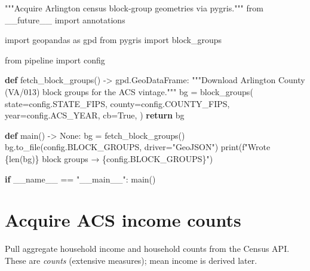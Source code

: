 \documentclass[
  letterpaper,
  DIV=11,
  numbers=noendperiod]{scrreprt}
\newenvironment{Shaded}{\begin{snugshade}}{\end{snugshade}}
\newcommand{\BuiltInTok}[1]{\textcolor[rgb]{0.00,0.23,0.31}{#1}}
\newcommand{\CommentTok}[1]{\textcolor[rgb]{0.37,0.37,0.37}{#1}}
\newcommand{\ControlFlowTok}[1]{\textcolor[rgb]{0.00,0.23,0.31}{\textbf{#1}}}
\newcommand{\ImportTok}[1]{\textcolor[rgb]{0.00,0.46,0.62}{#1}}
\newcommand{\KeywordTok}[1]{\textcolor[rgb]{0.00,0.23,0.31}{\textbf{#1}}}
\newcommand{\NormalTok}[1]{\textcolor[rgb]{0.00,0.23,0.31}{#1}}
\newcommand{\OperatorTok}[1]{\textcolor[rgb]{0.37,0.37,0.37}{#1}}
\newcommand{\SpecialCharTok}[1]{\textcolor[rgb]{0.37,0.37,0.37}{#1}}
\newcommand{\SpecialStringTok}[1]{\textcolor[rgb]{0.13,0.47,0.30}{#1}}
\newcommand{\StringTok}[1]{\textcolor[rgb]{0.13,0.47,0.30}{#1}}
\newcommand{\VariableTok}[1]{\textcolor[rgb]{0.07,0.07,0.07}{#1}}
\begin{document}
\begin{Shaded}
\begin{Highlighting}[]
\CommentTok{"""Acquire Arlington census block{-}group geometries via pygris."""}
\ImportTok{from}\NormalTok{ \_\_future\_\_ }\ImportTok{import}\NormalTok{ annotations}

\ImportTok{import}\NormalTok{ geopandas }\ImportTok{as}\NormalTok{ gpd}
\ImportTok{from}\NormalTok{ pygris }\ImportTok{import}\NormalTok{ block\_groups}

\ImportTok{from}\NormalTok{ pipeline }\ImportTok{import}\NormalTok{ config}


\KeywordTok{def}\NormalTok{ fetch\_block\_groups() }\OperatorTok{{-}\textgreater{}}\NormalTok{ gpd.GeoDataFrame:}
    \CommentTok{"""Download Arlington County (VA/013) block groups for the ACS vintage."""}
\NormalTok{    bg }\OperatorTok{=}\NormalTok{ block\_groups(}
\NormalTok{        state}\OperatorTok{=}\NormalTok{config.STATE\_FIPS,}
\NormalTok{        county}\OperatorTok{=}\NormalTok{config.COUNTY\_FIPS,}
\NormalTok{        year}\OperatorTok{=}\NormalTok{config.ACS\_YEAR,}
\NormalTok{        cb}\OperatorTok{=}\VariableTok{True}\NormalTok{,}
\NormalTok{    )}
    \ControlFlowTok{return}\NormalTok{ bg}


\KeywordTok{def}\NormalTok{ main() }\OperatorTok{{-}\textgreater{}} \VariableTok{None}\NormalTok{:}
\NormalTok{    bg }\OperatorTok{=}\NormalTok{ fetch\_block\_groups()}
\NormalTok{    bg.to\_file(config.BLOCK\_GROUPS, driver}\OperatorTok{=}\StringTok{"GeoJSON"}\NormalTok{)}
    \BuiltInTok{print}\NormalTok{(}\SpecialStringTok{f"Wrote }\SpecialCharTok{\{}\BuiltInTok{len}\NormalTok{(bg)}\SpecialCharTok{\}}\SpecialStringTok{ block groups → }\SpecialCharTok{\{}\NormalTok{config}\SpecialCharTok{.}\NormalTok{BLOCK\_GROUPS}\SpecialCharTok{\}}\SpecialStringTok{"}\NormalTok{)}


\ControlFlowTok{if} \VariableTok{\_\_name\_\_} \OperatorTok{==} \StringTok{"\_\_main\_\_"}\NormalTok{:}
\NormalTok{    main()}
\end{Highlighting}
\end{Shaded}

\section{Acquire ACS income counts}\label{acquire-acs-income-counts}

Pull aggregate household income and household counts from the Census
API. These are \emph{counts} (extensive measures); mean income is
derived later.
\end{document}
